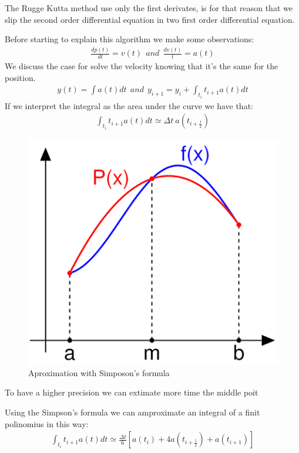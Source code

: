 \documentclass[a4paper]{article}
\begin{document}
The Rugge Kutta method use only the first derivates, is for that reason that we slip the second order differential equation in two first order differential equation. 

Before starting to explain this algorithm we make some observations: 
\begin{align}
\frac{dp(t)}{dt} = v(t) \ \ and \ \ \frac{dv(t)}{t} = a(t) 
\end{align}
We discuss the case for solve the velocity knowing that it's the same for the position.
\begin{align}
y(t) = \int a(t)dt \ \ and \  \ y_{i+1} = y_i + \int_{t_i}{t_{i+1}} a(t)dt
\end{align}
If we interpret the integral as the area under the curve we have that:
\begin{align}
\int_{t_i}{t_{i+1}} a(t)dt \simeq \Delta t \  a(t_{i+\frac{1}{2}})
\end{align}
\begin{figure}
\includegraphics[scale=0.3]{sim_int.png}
\caption{Aproximation with Simposon's formula}
\end{figure}
To have a higher precision we can extimate more time the middle poit 


Using the Simpson's formula we can amproximate an integral of a finit polinomius in this way: 
\begin{align}
\int_{t_i}{t_{i+1}} a(t)dt \simeq \frac{\Delta t}{6} \left [ a(t_i)+4a(t_{i+\frac{1}{2}})+ a(t_{i+1}) \right ] 
\end{align}
\end{document}
